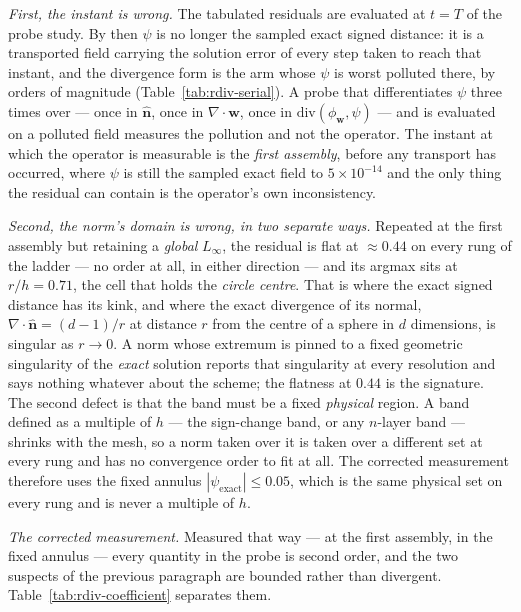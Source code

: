 \documentclass[preprint,3p,11pt]{elsarticle}
\newcommand{\psilev}{\psi}
\newcommand{\nhat}{\hat{\mathbf{n}}}
\begin{document}
\emph{First, the instant is wrong.} The tabulated residuals are evaluated at
$t=T$ of the probe study. By then $\psilev$ is no longer the sampled exact signed
distance: it is a transported field carrying the solution error of every step
taken to reach that instant, and the divergence form is the arm whose $\psilev$ is
worst polluted there, by orders of magnitude (Table~\ref{tab:rdiv-serial}). A probe
that differentiates $\psilev$ three times over --- once in $\nhat$, once in $\nabla\cdot\mathbf{w}$, once in
$\mathrm{div}(\phi_{\mathbf{w}},\psilev)$ --- and is evaluated on a polluted field
measures the pollution and not the operator. The instant at which the operator is
measurable is the \emph{first assembly}, before any transport has occurred, where
$\psilev$ is still the sampled exact field to $5\times10^{-14}$ and the only thing
the residual can contain is the operator's own inconsistency.

\emph{Second, the norm's domain is wrong, in two separate ways.} Repeated at the
first assembly but retaining a \emph{global} $L_\infty$, the residual is flat at
$\approx 0.44$ on every rung of the ladder --- no order at all, in either
direction --- and its argmax sits at $r/h = 0.71$, the cell that holds the
\emph{circle centre}. That is where the exact signed distance has its kink, and
where the exact divergence of its normal,
$\nabla\cdot\nhat = (d-1)/r$ at distance $r$ from the centre of a sphere in $d$
dimensions, is singular as $r \to 0$. A norm whose extremum is pinned to a fixed
geometric singularity of the \emph{exact} solution reports that singularity at every
resolution and says nothing whatever about the scheme; the flatness at $0.44$ is
the signature. The second defect is that the band must be a fixed \emph{physical}
region. A band defined as a multiple of $h$ --- the sign-change band, or any
$n$-layer band --- shrinks with the mesh, so a norm taken over it is taken over a
different set at every rung and has no convergence order to fit at all. The
corrected measurement therefore uses the fixed annulus
$|\psilev_{\text{exact}}| \le 0.05$, which is the same physical set on every rung
and is never a multiple of $h$.

\emph{The corrected measurement.} Measured that way --- at the first assembly, in
the fixed annulus --- every quantity in the probe is second order, and the two
suspects of the previous paragraph are bounded rather than divergent.
Table~\ref{tab:rdiv-coefficient} separates them.
\end{document}
